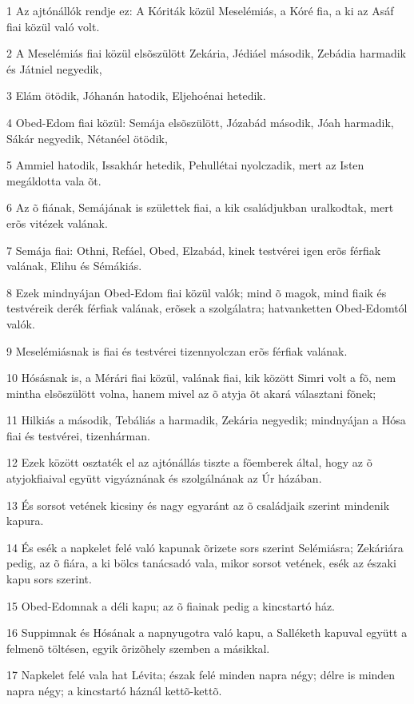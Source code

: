 \par 1 Az ajtónállók rendje ez: A Kóriták közül Meselémiás, a Kóré fia, a ki az Asáf  fiai közül való volt.
\par 2 A Meselémiás fiai közül elsõszülött Zekária, Jédiáel második, Zebádia harmadik és Játniel negyedik,
\par 3 Elám ötödik, Jóhanán hatodik, Eljehoénai hetedik.
\par 4 Obed-Edom fiai közül: Semája elsõszülött, Józabád második, Jóah harmadik, Sákár negyedik, Nétanéel ötödik,
\par 5 Ammiel hatodik, Issakhár hetedik, Pehullétai nyolczadik, mert az Isten megáldotta vala õt.
\par 6 Az õ fiának, Semájának is születtek fiai, a kik családjukban uralkodtak, mert erõs vitézek valának.
\par 7 Semája fiai: Othni, Refáel, Obed, Elzabád, kinek testvérei igen erõs férfiak valának, Elihu és Sémákiás.
\par 8 Ezek mindnyájan Obed-Edom fiai közül valók; mind õ magok, mind fiaik és testvéreik derék férfiak valának, erõsek a szolgálatra; hatvanketten Obed-Edomtól valók.
\par 9 Meselémiásnak is fiai és testvérei tizennyolczan erõs férfiak valának.
\par 10 Hósásnak is, a Mérári fiai közül, valának fiai, kik között Simri volt a fõ, nem mintha elsõszülött volna, hanem mivel az õ atyja õt akará választani fõnek;
\par 11 Hilkiás a második, Tebáliás a harmadik, Zekária negyedik; mindnyájan a Hósa fiai és testvérei, tizenhárman.
\par 12 Ezek között osztaték el az ajtónállás tiszte a fõemberek által, hogy az õ atyjokfiaival együtt vigyáznának és szolgálnának az Úr házában.
\par 13 És sorsot vetének kicsiny és nagy egyaránt az õ családjaik szerint mindenik kapura.
\par 14 És esék a napkelet felé való kapunak õrizete sors szerint Selémiásra; Zekáriára pedig, az õ fiára, a ki bölcs tanácsadó vala, mikor sorsot vetének, esék az északi kapu sors szerint.
\par 15 Obed-Edomnak a déli kapu; az õ fiainak pedig a kincstartó ház.
\par 16 Suppimnak és Hósának a napnyugotra való kapu, a Salléketh kapuval együtt a felmenõ töltésen, egyik õrizõhely szemben a másikkal.
\par 17 Napkelet felé vala hat Lévita; észak felé minden napra négy; délre is minden napra négy; a kincstartó háznál kettõ-kettõ.
